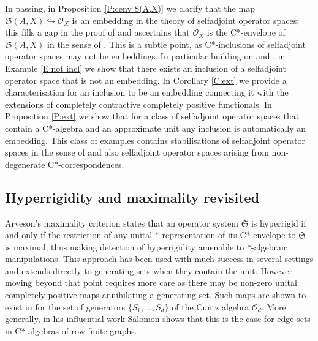 \documentclass[11pt, draft]{amsart}
\numberwithin{equation}{section}
\theoremstyle{plain}
\theoremstyle{definition}
\theoremstyle{remark}
\renewcommand{\O}{{\mathcal{O}}}
\newcommand{\fS}{{\mathfrak{S}}}
\begin{document}
In passing, in Proposition \ref{P:cenv S(A,X)} we clarify that the map $\fS(A,X) \hookrightarrow \O_X$ is an embedding in the theory of selfadjoint operator spaces; this fills a gap in the proof of \cite[Proposition 2.6]{Kim21} and ascertains that $\O_X$ is the C*-envelope of $\fS(A,X)$ in the sense of \cite{CS21, KKM23}.
This is a subtle point, as C*-inclusions of selfadjoint operator spaces may not be embeddings. 
In particular building on \cite[Example 2.14]{KKM23} and \cite[Example 4.1]{Rus23}, in Example \ref{E:not incl} we show that there exists an inclusion of a selfadjoint operator space that is not an embedding.
In Corollary \ref{C:ext} we provide a characterisation for an inclusion to be an embedding connecting it with the extensions of completely contractive completely positive functionals. 
In Proposition \ref{P:ext} we show that for a class of selfadjoint operator spaces that contain a C*-algebra and an approximate unit any inclusion is automatically an embedding. This class of examples contains stabilisations of selfadjoint operator spaces in the sense of \cite{CS21} and also selfadjoint operator spaces arising from non-degenerate C*-correspondences.


\subsection{Hyperrigidity and maximality revisited}

Arveson's maximality criterion states that an operator system $\fS$ is hyperrigid if and only if the restriction of any unital $*$-representation of its C*-envelope to $\fS$ is maximal, thus making detection of hyperrigidity amenable to $*$-algebraic manipulations.
This approach has been used with much success in several settings and extends directly to generating sets when they contain the unit.
However moving beyond that point requires more care as there may be non-zero unital completely positive maps annihilating a generating set.
Such maps are shown to exist in \cite[Example 3.4]{Sal17} for the set of generators $\{S_1, \dots, S_d\}$ of the Cuntz algebra $\O_d$.
More generally, in his influential work Salomon \cite{Sal17} shows that this is the case for edge sets in C*-algebras of row-finite graphs.
\end{document}
